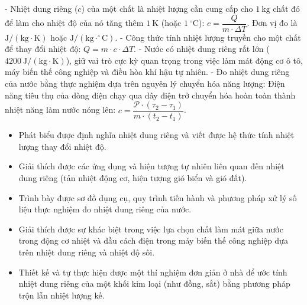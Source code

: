 \begin{kienthuc}
- Nhiệt dung riêng ($c$) của một chất là nhiệt lượng cần cung cấp cho $1\ \mathrm{kg}$ chất đó để làm cho nhiệt độ của nó tăng thêm $1\ \mathrm{K}$ (hoặc $1\ \mathrm{^\circ C}$): $c = \dfrac{Q}{m \cdot \Delta T}$. Đơn vị đo là $\mathrm{J/(kg\cdot K)}$ hoặc $\mathrm{J/(kg\cdot ^\circ C)}$.
- Công thức tính nhiệt lượng truyền cho một chất để thay đổi nhiệt độ: $Q = m \cdot c \cdot \Delta T$.
- Nước có nhiệt dung riêng rất lớn ($4200\ \mathrm{J/(kg\cdot K)}$), giữ vai trò cực kỳ quan trọng trong việc làm mát động cơ ô tô, máy biến thế công nghiệp và điều hòa khí hậu tự nhiên.
- Đo nhiệt dung riêng của nước bằng thực nghiệm dựa trên nguyên lý chuyển hóa năng lượng: Điện năng tiêu thụ của dòng điện chạy qua dây điện trở chuyển hóa hoàn toàn thành nhiệt năng làm nước nóng lên: $c = \dfrac{\mathscr{P} \cdot (\tau_2 - \tau_1)}{m \cdot (t_2 - t_1)}$.
\end{kienthuc}

\begin{emdahoc}
\begin{itemize}
    \item Phát biểu được định nghĩa nhiệt dung riêng và viết được hệ thức tính nhiệt lượng thay đổi nhiệt độ.
    \item Giải thích được các ứng dụng và hiện tượng tự nhiên liên quan đến nhiệt dung riêng (tản nhiệt động cơ, hiện tượng gió biển và gió đất).
    \item Trình bày được sơ đồ dụng cụ, quy trình tiến hành và phương pháp xử lý số liệu thực nghiệm đo nhiệt dung riêng của nước.
\end{itemize}
\end{emdahoc}

\begin{emcothe}
\begin{itemize}
    \item Giải thích được sự khác biệt trong việc lựa chọn chất làm mát giữa nước trong động cơ nhiệt và dầu cách điện trong máy biến thế công nghiệp dựa trên nhiệt dung riêng và nhiệt độ sôi.
    \item Thiết kế và tự thực hiện được một thí nghiệm đơn giản ở nhà để ước tính nhiệt dung riêng của một khối kim loại (như đồng, sắt) bằng phương pháp trộn lẫn nhiệt lượng kế.
\end{itemize}
\end{emcothe}